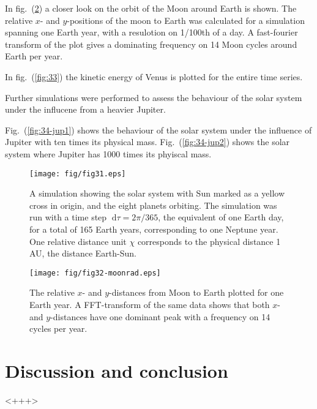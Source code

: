 \documentclass[a4paper,11pt]{article}
\newcommand{\diff}{\ensuremath{\; \text{d}}}
\begin{document}
In fig.~(\ref{fig:32}) a closer look on the orbit of the Moon around Earth is shown. The relative $x$- and $y$-positions of the moon to Earth was calculated for a simulation spanning one Earth year, with a resulotion on 1/100th of a day. A fast-fourier transform of the plot gives a dominating frequency on 14 Moon cycles around Earth per year.

In fig.~(\ref{fig:33}) the kinetic energy of Venus is plotted for the entire time series. 

Further simulations were performed to assess the behaviour of the solar system under the influcene from a heavier Jupiter. 

Fig.~(\ref{fig:34-jup1}) shows the behaviour of the solar system under the influence of Jupiter with ten times its physical mass. Fig.~(\ref{fig:34-jup2}) shows the solar system where Jupiter has 1000 times its phyiscal mass.

\begin{figure}[htb]
    \centering
    \texttt{[image: fig/fig31.eps]}
    \caption{A simulation showing the solar system with Sun marked as a yellow cross in origin, and the eight planets orbiting. The simulation was run with a time step $\diff \tau = 2\pi/365$, the equivalent of one Earth day, for a total of 165 Earth years, corresponding to one Neptune year. One relative distance unit $\chi$ corresponds to the physical distance 1 AU, the distance Earth-Sun. }
    \label{fig:31}
\end{figure}

\begin{figure}[htb]
    \centering
    \texttt{[image: fig/fig32-moonrad.eps]}
    \caption{The relative $x$- and $y$-distances from Moon to Earth plotted for one Earth year. A FFT-transform of the same data shows that both $x$- and $y$-distances have one dominant peak with a frequency on 14 cycles per year.}
    \label{fig:32}
\end{figure}



\section{Discussion and conclusion}<+++>



\end{document}
